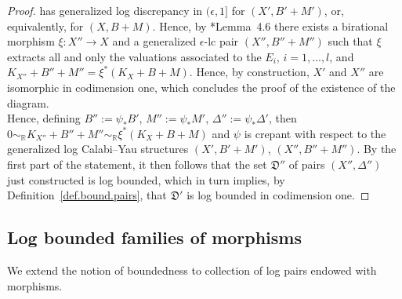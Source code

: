 \documentclass[11pt]{ip-journal}
\theoremstyle{definition}
\begin{document}
\begin{proof}
has generalized log discrepancy in 
$(\epsilon, 1]$
for 
$(X', B'+M')$, 
or, equivalently, 
for 
$(X, B+M)$.
Hence, by 
\cite{bir-zh}*{Lemma~4.6}
there exists a birational morphism
$\xi \colon X'' \to X$ 
and a generalized $\epsilon$-lc pair
$(X'', B''+M'')$ 
such that 
$\xi$
extracts all and only the valuations associated to the 
$E_i$, 
$i=1, \dots, l$,
and 
$K_{X''}+ B''+M'' = \xi^\ast (K_X+B+M)$.
Hence, by construction, 
$X'$ 
and
$X''$
are isomorphic in codimension one, which concludes the proof of the existence of the diagram. 
\\
Hence, 
defining 
$B'' := \psi_\ast B'$,
$M'' := \psi_\ast M'$,
$\Delta'' := \psi_\ast \Delta'$,
then 
$0 
\sim_{\mathbb R}
K_{X''}+B''+M''
\sim_{\mathbb R}
\xi^\ast(K_X+B+M)
$ 
and 
$\psi$ 
is crepant with respect to the generalized log Calabi--Yau structures 
$(X', B'+M')$,
$(X'', B''+M'')$.
By the first part of the statement, it then follows that the set 
$\mathfrak D''$
of pairs
$(X'',  \Delta'')$
just constructed is log bounded, which in turn implies, by Definition~\ref{def.bound.pairs}, that $\mathfrak D'$ is log bounded in codimension one.
\end{proof}

\subsection{Log bounded families of morphisms}
\label{bound.morph.subsect}

We extend the notion of boundedness to collection of log pairs endowed with morphisms.
\end{document}
